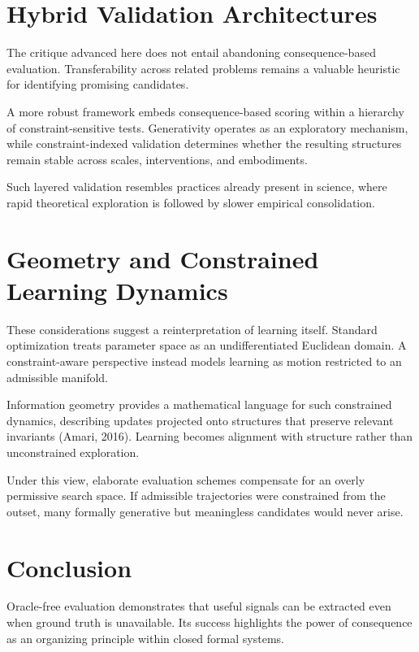 \documentclass[12pt]{article}
\begin{document}
\section{Hybrid Validation Architectures}

The critique advanced here does not entail abandoning consequence-based evaluation. Transferability across related problems remains a valuable heuristic for identifying promising candidates.

A more robust framework embeds consequence-based scoring within a hierarchy of constraint-sensitive tests. Generativity operates as an exploratory mechanism, while constraint-indexed validation determines whether the resulting structures remain stable across scales, interventions, and embodiments.

Such layered validation resembles practices already present in science, where rapid theoretical exploration is followed by slower empirical consolidation.

\section{Geometry and Constrained Learning Dynamics}

These considerations suggest a reinterpretation of learning itself. Standard optimization treats parameter space as an undifferentiated Euclidean domain. A constraint-aware perspective instead models learning as motion restricted to an admissible manifold.

Information geometry provides a mathematical language for such constrained dynamics, describing updates projected onto structures that preserve relevant invariants (Amari, 2016). Learning becomes alignment with structure rather than unconstrained exploration.

Under this view, elaborate evaluation schemes compensate for an overly permissive search space. If admissible trajectories were constrained from the outset, many formally generative but meaningless candidates would never arise.

\section{Conclusion}

Oracle-free evaluation demonstrates that useful signals can be extracted even when ground truth is unavailable. Its success highlights the power of consequence as an organizing principle within closed formal systems.
\end{document}
